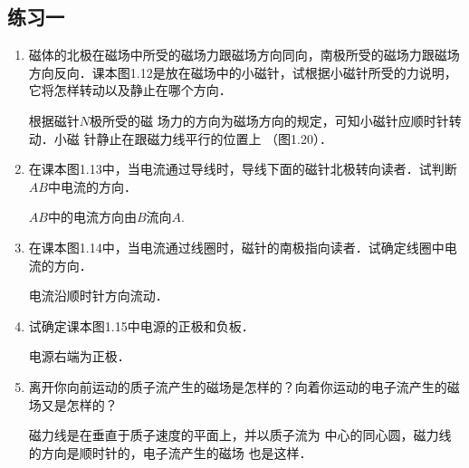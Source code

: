 \subsection{练习一}
\begin{enumerate}
    \item 磁体的北极在磁场中所受的磁场力跟磁场方向同向，南极所受的磁场力跟磁场方向反向．课本图1.12是放在磁场中的小磁针，试根据小磁针所受的力说明，它将怎样转动以及静止在哪个方向．
\begin{figure}[htp]
\centering
{}
\caption{}
\end{figure}




\begin{solution}
    根据磁针$N$极所受的磁
    场力的方向为磁场方向的规定，可知小磁针应顺时针转动．小磁
    针静止在跟磁力线平行的位置上
    （图1.20）．
\end{solution}

    \item 在课本图1.13中，当电流通过导线时，导线下面的磁针北极转向读者．试判断$AB$中电流的方向．


    \begin{solution}
        $AB$中的电流方向由$B$流向$A$.
    \end{solution}
    
    \item 在课本图1.14中，当电流通过线圈时，磁针的南极指向读者．试确定线圈中电流的方向．


    \begin{solution}
        电流沿顺时针方向流动．
    \end{solution}
 

    \item 试确定课本图1.15中电源的正极和负板．


    \begin{solution}
        电源右端为正极．
    \end{solution}
    
    \item 离开你向前运动的质子流产生的磁场是怎样的？向着你运动的电子流产生的磁场又是怎样的？


    \begin{solution}
        磁力线是在垂直于质子速度的平面上，并以质子流为
        中心的同心圆，磁力线的方向是顺时针的，电子流产生的磁场
        也是这样．
    \end{solution}
    
\end{enumerate}




